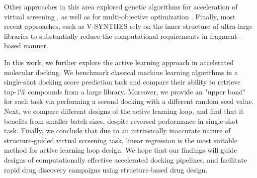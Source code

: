 Other approaches in this area explored genetic algorithms for acceleration of virtual screening \cite{Jensen2019,Ree2021}, as well as for multi-objective optimization \cite{Steinmann2021}. Finally, most recent approaches, such as V-SYNTHES \cite{Sadybekov2021_vsynthes} rely on the inner structure of ultra-large libraries to substantially reduce the computational requirements in fragment-based manner.

In this work, we further explore the active learning approach in accelerated molecular docking. We benchmark classical machine learning algorithms in a single-shot docking score prediction task and compare their ability to retrieve top-1\% compounds from a large library. Moreover, we provide an "upper bond" for such task via performing a second docking with a different random seed value. Next, we compare different designs of the active learning loop, and find that it benefits from smaller batch sizes, despite reversed performance in single-shot task. Finally, we conclude that due to an intrinsically inaccurate nature of structure-guided virtual screening task, linear regression is the most suitable method for active learning loop design. We hope that our findings will guide designs of computationally effective accelerated docking pipelines, and facilitate rapid drug discovery campaigns using structure-based drug design.


 




